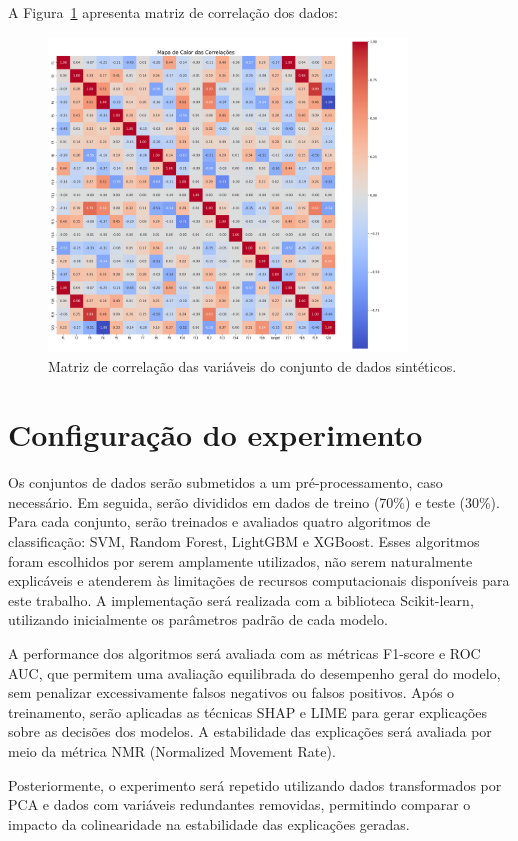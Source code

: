 A Figura~\ref{fig:matriz_correlacao_dados_sinteticos} apresenta matriz de correlação dos dados:

\begin{figure}[H]
    \centering
    \includegraphics[width=0.85\textwidth]{figs/matriz_correlacao_dados_sinteticos.png}
    \caption{Matriz de correlação das variáveis do conjunto de dados sintéticos.}
    \label{fig:matriz_correlacao_dados_sinteticos}
\end{figure}


\section{Configuração do experimento}\label{sec:cofiguracao_experimentos}
Os conjuntos de dados serão submetidos a um pré-processamento, caso necessário. Em seguida, serão divididos em dados de treino (70\%) e teste (30\%). Para cada conjunto, serão treinados e avaliados quatro algoritmos de classificação: SVM, Random Forest, LightGBM e XGBoost. Esses algoritmos foram escolhidos por serem amplamente utilizados, não serem naturalmente explicáveis e atenderem às limitações de recursos computacionais disponíveis para este trabalho. A implementação será realizada com a biblioteca Scikit-learn, utilizando inicialmente os parâmetros padrão de cada modelo.

A performance dos algoritmos será avaliada com as métricas F1-score e ROC AUC, que permitem uma avaliação equilibrada do desempenho geral do modelo, sem penalizar excessivamente falsos negativos ou falsos positivos. Após o treinamento, serão aplicadas as técnicas SHAP e LIME para gerar explicações sobre as decisões dos modelos. A estabilidade das explicações será avaliada por meio da métrica NMR (Normalized Movement Rate).

Posteriormente, o experimento será repetido utilizando dados transformados por PCA e dados com variáveis redundantes removidas, permitindo comparar o impacto da colinearidade na estabilidade das explicações geradas.



